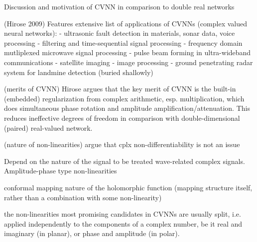 Discussion and motivation of CVNN in comparison to double real networks

(Hirose 2009)
Features extensive list of applications of CVNNs (complex valued neural networks):
- ultrasonic fault detection in materials, sonar data, voice processing
- filtering and time-sequential signal processing
- frequency domain mutliplexed microwave signal processing
- pulse beam forming in ultra-wideband communications
- satellite imaging
- image processing
- ground penetrating radar system for landmine detection (buried shallowly)

(merits of CVNN)
Hirose argues that the key merit of CVNN is the built-in (embedded) regularization from
complex arithmetic, esp. multiplication, which does simultaneous phase rotation and amplitude
amplification/attenuation. This reduces ineffective degrees of freedom in comparison
with double-dimensional (paired) real-valued network.

(nature of non-linearities)
argue that cplx non-differentiability is not an issue

Depend on the nature of the signal to be treated wave-related complex signals.
Amplitude-phase type non-linearities

conformal mapping nature of the holomorphic function (mapping structure itself, rather than a combination with some non-linearity)

the non-linearities most promising candidates in CVNNs are usually split, i.e. applied independently to the components of a
complex number, be it real and imaginary (in planar), or phase and amplitude (in polar).

